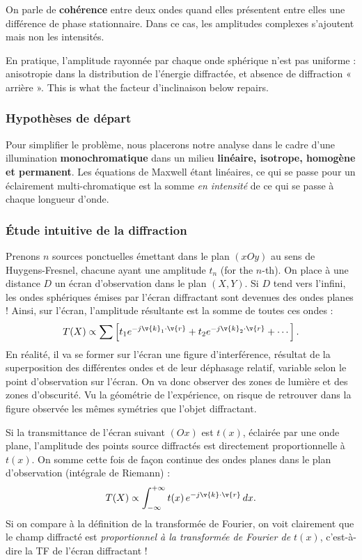 \begin{remark}
  On parle de \textbf{cohérence} entre deux ondes quand elles présentent entre
  elles une différence de phase stationnaire. Dans ce cas, les amplitudes
  complexes s'ajoutent mais non les intensités.
\end{remark}

\begin{remark}
  En pratique, l'amplitude rayonnée par chaque onde sphérique n'est pas
  uniforme : anisotropie dans la distribution de l'énergie diffractée, et
  absence de diffraction « arrière ». This is what the facteur d'inclinaison
  below repairs.
\end{remark}

\subsubsection{Hypothèses de départ}
Pour simplifier le problème, nous placerons notre analyse dans le cadre d'une
illumination \textbf{monochromatique} dans un milieu \textbf{linéaire, isotrope,
homogène et permanent}. Les équations de Maxwell étant linéaires, ce qui se
passe pour un éclairement multi-chromatique est la somme \emph{en intensité} de
ce qui se passe à chaque longueur d'onde.

\subsubsection{Étude intuitive de la diffraction}
Prenons $n$ sources ponctuelles émettant dans le plan $(xOy)$ au sens de
Huygens-Fresnel, chacune ayant une amplitude $t_n$ (for the $n$-th). On place à
une distance $D$ un écran d'observation dans le plan $(X,Y)$. Si $D$ tend vers
l'infini, les ondes sphériques émises par l'écran diffractant sont devenues des
ondes planes ! Ainsi, sur l'écran, l'amplitude résultante est la somme de toutes
ces ondes :
\[
  T(X) \propto \sum \left[ t_1 e^{-j\v{k}_1 \cdot \v{r}}
                         + t_2 e^{-j\v{k}_2 \cdot \v{r}} + \cdots \right].
\]
En réalité, il va se former sur l'écran une figure d'interférence, résultat de
la superposition des différentes ondes et de leur déphasage relatif, variable
selon le point d'observation sur l'écran. On va donc observer des zones de
lumière et des zones d'obscurité. Vu la géométrie de l'expérience, on risque de
retrouver dans la figure observée les mêmes symétries que l'objet diffractant.

Si la transmittance de l'écran suivant $(Ox)$ est $t(x)$, éclairée par une onde
plane, l'amplitude des points source diffractés est directement proportionnelle
à $t(x)$. On somme cette fois de façon continue des ondes planes dans le plan
d'observation (intégrale de Riemann) :
\begin{equation*}
  T(X) \propto \int_{-\infty}^{+\infty} t(x)\, e^{-j\v{k}\cdot\v{r}}\, dx .
\end{equation*}
Si on compare à la définition de la transformée de Fourier, on voit clairement
que le champ diffracté est \emph{proportionnel à la transformée de Fourier de
$t(x)$}, c'est-à-dire la TF de l'écran diffractant !

